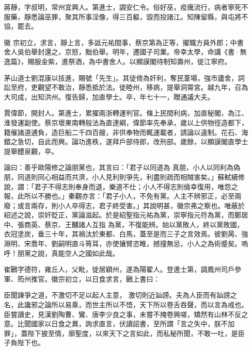 \begin{pinyinscope}
 蔣靜，字叔明，常州宜興人。第進士，調安仁令。俗好巫，疫癘流行，病者寧死不服藥，靜悉論巫罪，聚其所事淫像，得三百軀，毀而投諸江。知陳留縣，與屯將不協，罷去。



 徽
 宗初立，求言，靜上言，多詆元祐間事，蔡京第為正等，擢職方員外郎；中書舍人吳伯舉封還之，京怒，黜伯舉。明年，遷國子司業。帝幸太學，命講《書·無逸篇》，賜服金紫，進祭酒，為中書舍人。以顯謨閣待制知壽州，徙江寧府。



 茅山道士劉混康以技進，賜號「先生」。其徒倚為奸利，奪民葦場，強市廬舍，詞訟至府，吏觀望不敢治，靜悉抵於法。徙睦州，移病，提舉洞霄宮。越九年，召為大司成，出知洪州。復告歸，加直學士。卒，年七十一，贈通議大夫。



 賈偉節，開封人。第進士，累擢兩浙轉運判官。條上民間利病，加直秘閣，為江、淮發運副使。蔡京壞東南轉般法為直達綱，偉節率先奉承，歲以上供物徑造都下，籍催諸道逋負，造巨船二千四百艘，非供奉物而輒運載者，請論以違制。花石、海錯之急切，自此而興。論功進秩，遂拜戶部侍郎，改刑部。歲餘，以顯謨閣直學士提舉醴泉觀，卒。



 論曰：善乎歐陽修之論朋黨也，其言曰：「君子以同道為
 真朋，小人以同利為偽朋，同道則同心相益而共濟，小人見利則爭先，利盡則疏而相賊害矣。」蘇軾續修說，謂：「君子不得志則奉身而退，樂道不仕；小人不得志則僥幸復用，唯怨之報，此所以不勝也。」秦觀亦言：「君子小人，不免有黨。人主不辨邪正，必至兩廢；或言兩存，則小人卒得志，君子終受害。」其說明甚，徽宗弗之察也。唯蔽於紹述之說，崇奸貶正，黨論滋起。於是紹聖指元祐為黨，崇寧指元符為黨，而鄭居中、張商英、蔡京、王黼諸人互指
 為黨，不復能辨。始以黨敗人，終以黨敗國，衣冠塗炭，垂三十年，其禍汰於東都、白馬，蓋至是而三子之言效焉。彼劉昺、強淵明、宋喬年、劉嗣明直斗筲耳，亦使攘臂恣睢，撼撞無忌，小人之為術蹙矣。嗚呼！朋黨之說，真能空人之國如此哉。



 崔鶠字德符，雍丘人，父毗，徙居穎州，遂為陽翟人。登進士第，調鳳州司戶參軍、筠州推官。徽宗初立，以日食求言，鶠上書曰：



 臣聞諫爭之道，不激切不足以起人主意，
 激切則近訕謗。夫為人臣而有訕謗之名，此讒邪之論所以易乘，而世主所以不悟，天下所以卷舌吞聲，而以言為戒也。臣嘗讀史，見漢劉陶曹、鸞、唐李少良之事，未嘗不掩卷興嗟，矯然有山林不反之意。比聞國家以日食之異，詢求直言，伏讀詔書，至所謂「言之失中，朕不加罪」，蓋陛下披至情，廓聖度，以來天下之言如此，而私秘所聞，不敢一吐，是臣子負陛下也。




\end{pinyinscope}
